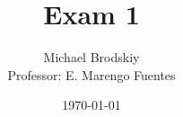 


\title{Exam 1}
\date{\today}
\author{Michael Brodskiy\\ \small Professor: E. Marengo Fuentes}



\maketitle

